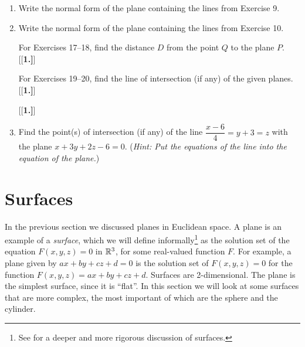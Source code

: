 \begin{enumerate}[\bfseries 1.]
\par\noindent For Exercises 13--14, write the normal form of the plane containing the given points.
[{[\bfseries 1.]}]
 \item Write the normal form of the plane containing the lines from Exercise 9.
 \item Write the normal form of the plane containing the lines from Exercise 10.
\par\noindent For Exercises 17--18, find the distance $D$ from the point $Q$ to the plane $P$.
[{[\bfseries 1.]}]
\par\noindent For Exercises 19--20, find the line of intersection (if any) of the given planes.
[{[\bfseries 1.]}]
[{[\bfseries 1.]}]
 \item Find the point(s) of intersection (if any) of the line $\dfrac{x - 6}{4} = y + 3 = z$ with the plane
 $x + 3y + 2z - 6 = 0$. (\emph{Hint: Put the equations of the line into the equation of the plane.})
\end{enumerate}
\newpage
\section{Surfaces}
In the previous section we discussed planes in Euclidean space. A plane is an example of a \emph{surface}, which we
will define informally\footnote{See \cite{one} for a deeper and more rigorous discussion of surfaces.} as the
solution set of the equation $F(x,y,z) = 0$ in $\mathbb{R}^{3}$, for some real-valued function $F$. For example, a plane
given by $ax + by + cz + d = 0$ is the solution set of $F(x,y,z) = 0$ for the function $F(x,y,z) = ax + by + cz + d$.
Surfaces are 2-dimensional. The plane is the simplest surface, since it is ``flat''. In this
section we will look at some surfaces that are more complex, the most important of which are the sphere and the
cylinder.


